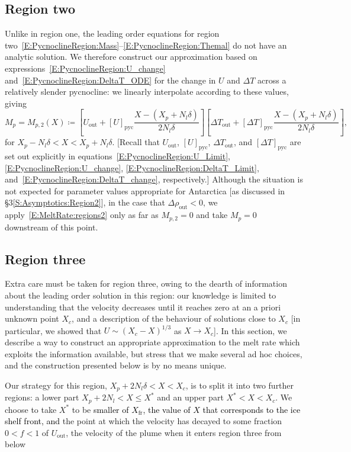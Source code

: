 \documentclass[openacc]{rsproca_new}%
\newcommand{\red}[1]{{\color{red} #1}}
\newcommand{\blue}[1]{{\color{blue} #1}}
\newcommand{\rout}[1]{\red{\st{#1}}}\newcommand{\ab}[1]{\textcolor{Green}{#1}}\newcommand{\about}[1]{\textcolor{Cyan}{\sout{#1}}}
\renewcommand{\rout}[1]{{}} %
\renewcommand{\blue}[1]{{\textcolor{black}{#1}}} %
\renewcommand{\red}[1]{{}} %
\newcommand{\lt}{\delta} %
\newcommand{\out}{\text{out}}
\begin{document}
\subsection{Region two}
Unlike in region one, the leading order equations for region two~\eqref{E:PycnoclineRegion:Mass}--\eqref{E:PycnoclineRegion:Themal} do not have an analytic solution. We therefore construct our approximation based on expressions~\eqref{E:PycnoclineRegion:U_change} and~\eqref{E:PycnoclineRegion:DeltaT_ODE} for the change in $U$ and $\Delta T$ across a relatively slender pycnocline: we linearly interpolate according to these values, giving
\begin{equation}\label{E:MeltRate:regions2}
M_{p} = M_{p,2}(X) \coloneqq \left[U_{\out} + \left[U\right]_{\text{pyc}} \frac{X - (X_p + N_l \lt)}{2N_l \lt}\right]  \left[\Delta T_{\out} +  \left[\Delta T\right]_{\text{pyc}} \frac{X - (X_p + N_l \lt)}{2N_l \lt}\right] , 
\end{equation}
for $ X_p - N_l \lt  < X < X_p + N_l \lt$. [Recall that $U_\out$, $\left[U\right]_{\text{pyc}}$, $\Delta T_\out$, and $\left[\Delta T\right]_{\text{pyc}}$ are set out explicitly in equations~\eqref{E:PycnoclineRegion:U_Limit}, \eqref{E:PycnoclineRegion:U_change}, \eqref{E:PycnoclineRegion:DeltaT_Limit}, and~\eqref{E:PycnoclineRegion:DeltaT_change}, respectively.] Although the situation is not expected for parameter values appropriate for Antarctica [as discussed in \S3\ref{S:Asymptotics:Region2}], in the case that $\Delta \rho_\out < 0$, we apply~\eqref{E:MeltRate:regions2} only as far as $M_{p,2} = 0$ and take $M_{p} = 0$ downstream of this point.


\subsection{Region three}\label{S:MeltRate:R3}
Extra care must be taken for region three, owing to the dearth of information about the leading order solution in this region: our knowledge is limited to understanding that the velocity decreases until it reaches zero at an a priori unknown point $X_c$, and a description of the behaviour of solutions close to $X_c$ [in particular, we showed that $U \sim (X_c - X)^{1/3}$ as $X \to X_c$]. In this section, we describe a way to construct an appropriate approximation to the melt rate which exploits the information available, but stress that we make several ad hoc choices, and the construction presented below is by no means unique.

Our strategy for this region, $X_p + 2N_l \lt < X < X_c$, is to split it into two further regions: a lower part $X_p + 2 N_l < X \leq X^*$ and an upper part $X^* < X < X_c$. We choose to take $X^*$ to be \blue{smaller of $X_{\text{fr}}$, the value of $X$ that corresponds to the ice shelf front, and} the point at which the velocity has decayed to some fraction $0 < f < 1$ of $U_\out$, the velocity of the plume when it enters region three from below \rout{(assuming for the moment that such a point exists).}
\end{document}
